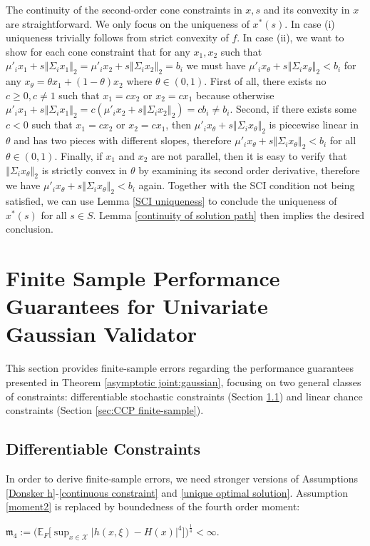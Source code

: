 \documentclass[mnsc,blindrev]{informs4} %
\newcommand{\norm}[1]{\left \Vert #1 \right\Vert}
\newcommand{\abs}[1]{\left \vert #1 \right\vert}
\begin{document}
The continuity of the second-order cone constraints in $x,s$ and its convexity in $x$ are straightforward. We only focus on the uniqueness of $x^*(s)$. In case (i) uniqueness trivially follows from strict convexity of $f$. In case (ii), we want to show for each cone constraint that for any $x_1,x_2$ such that $\mu'_ix_1+s\norm{\Sigma_ix_1}_2=\mu'_ix_2+s\norm{\Sigma_ix_2}_2=b_i$ we must have $\mu'_ix_{\theta}+s\norm{\Sigma_ix_{\theta}}_2<b_i$ for any $x_{\theta}=\theta x_1+(1-\theta)x_2$ where $\theta\in (0,1)$. First of all, there exists no $c\geq 0,c\neq 1$ such that $x_1=cx_2$ or $x_2=cx_1$ because otherwise $\mu'_ix_1+s\norm{\Sigma_ix_1}_2=c(\mu'_ix_2+s\norm{\Sigma_ix_2}_2)=cb_i\neq b_i$. Second, if there exists some $c<0$ such that $x_1=cx_2$ or $x_2=cx_1$, then $\mu'_ix_{\theta}+s\norm{\Sigma_ix_{\theta}}_2$ is piecewise linear in $\theta$ and has two pieces with different slopes, therefore $\mu'_ix_{\theta}+s\norm{\Sigma_ix_{\theta}}_2<b_i$ for all $\theta\in (0,1)$. Finally, if $x_1$ and $x_2$ are not parallel, then it is easy to verify that $\norm{\Sigma_ix_{\theta}}_2$ is strictly convex in $\theta$ by examining its second order derivative, therefore we have $\mu'_ix_{\theta}+s\norm{\Sigma_ix_{\theta}}_2<b_i$ again. Together with the SCI condition not being satisfied, we can use Lemma \ref{SCI uniqueness} to conclude the uniqueness of $x^*(s)$ for all $s\in S$. Lemma \ref{continuity of solution path} then implies the desired conclusion. \hfill\Halmos



\section{Finite Sample Performance Guarantees for Univariate Gaussian Validator}\label{sec:finite sample error univariate gaussian}
This section provides finite-sample errors regarding the performance guarantees presented in Theorem \ref{asymptotic joint:gaussian}, focusing on two general classes of constraints: differentiable stochastic constraints (Section \ref{sec:differentiable finite-sample}) and linear chance constraints (Section \ref{sec:CCP finite-sample}).

 \subsection{Differentiable Constraints}\label{sec:differentiable finite-sample}
 In order to derive finite-sample errors, we need stronger versions of Assumptions \ref{Donsker h}-\ref{continuous constraint} and \ref{unique optimal solution}. Assumption \ref{moment2} is replaced by boundedness of the fourth order moment:
 \begin{assumption}\label{moment4}
 $\mathfrak{m}_4:=\big(\mathbb E_F\big[\sup_{x\in\mathcal X}\abs{h(x,\xi)-H(x)}^4\big]\big)^{\frac{1}{4}}<\infty$.
 \end{assumption}
\end{document}
